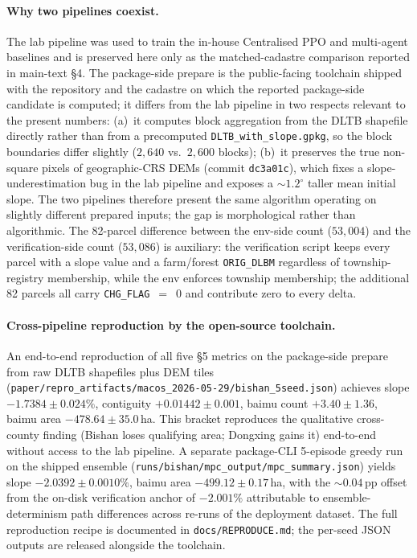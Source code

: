 \documentclass[11pt]{article}
\begin{document}
\paragraph{Why two pipelines coexist.} The lab pipeline was used to train the in-house Centralised PPO and multi-agent baselines and is preserved here only as the matched-cadastre comparison reported in main-text \S4. The package-side prepare is the public-facing toolchain shipped with the repository and the cadastre on which the reported package-side candidate is computed; it differs from the lab pipeline in two respects relevant to the present numbers: (a)~it computes block aggregation from the DLTB shapefile directly rather than from a precomputed \texttt{DLTB\_with\_slope.gpkg}, so the block boundaries differ slightly ($2{,}640$ vs.\ $2{,}600$ blocks); (b)~it preserves the true non-square pixels of geographic-CRS DEMs (commit \texttt{dc3a01c}), which fixes a slope-underestimation bug in the lab pipeline and exposes a $\sim$$1.2^{\circ}$ taller mean initial slope. The two pipelines therefore present the same algorithm operating on slightly different prepared inputs; the gap is morphological rather than algorithmic. The 82-parcel difference between the env-side count ($53{,}004$) and the verification-side count ($53{,}086$) is auxiliary: the verification script keeps every parcel with a slope value and a farm/forest \texttt{ORIG\_DLBM} regardless of township-registry membership, while the env enforces township membership; the additional 82 parcels all carry \texttt{CHG\_FLAG}~$=$~$0$ and contribute zero to every delta.

\paragraph{Cross-pipeline reproduction by the open-source toolchain.} An end-to-end reproduction of all five \S5 metrics on the package-side prepare from raw DLTB shapefiles plus DEM tiles (\texttt{paper/repro\_artifacts/macos\_2026-05-29/bishan\_5seed.json}) achieves slope $-1.7384 \pm 0.024\%$, contiguity $+0.01442 \pm 0.001$, baimu count $+3.40 \pm 1.36$, baimu area $-478.64 \pm 35.0$\,ha. This bracket reproduces the qualitative cross-county finding (Bishan loses qualifying area; Dongxing gains it) end-to-end without access to the lab pipeline. A separate package-CLI 5-episode greedy run on the shipped ensemble (\texttt{runs/bishan/mpc\_output/mpc\_summary.json}) yields slope $-2.0392 \pm 0.0010\%$, baimu area $-499.12 \pm 0.17$\,ha, with the $\sim$$0.04$\,pp offset from the on-disk verification anchor of $-2.001\%$ attributable to ensemble-determinism path differences across re-runs of the deployment dataset. The full reproduction recipe is documented in \texttt{docs/REPRODUCE.md}; the per-seed JSON outputs are released alongside the toolchain.
\end{document}
